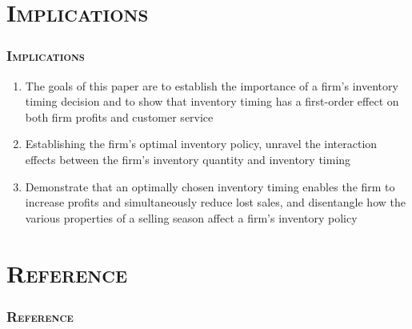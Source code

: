 \documentclass[aspectratio=169]{../presentation}
\begin{document}
    \section{\textsc{Implications}}

    \begin{frame}
        \frametitle{\textsc{Implications}}

        \begin{enumerate}
            \item The goals of this paper are to establish the importance of a firm's inventory timing decision and to show that inventory timing has a first-order effect on both firm profits and customer service
            \item Establishing the firm's optimal inventory policy, unravel the interaction effects between the firm's inventory quantity and inventory timing
            \item Demonstrate that an optimally chosen inventory timing enables the firm to increase profits and simultaneously reduce lost sales, and disentangle how the various properties of a selling season affect a firm's inventory policy
        \end{enumerate}

    \end{frame}

    \section{\textsc{Reference}}

    \begin{frame}[allowframebreaks]
        \frametitle{\textsc{Reference}}
        {
            \scriptsize
            
            
        }
    \end{frame}
\end{document}
